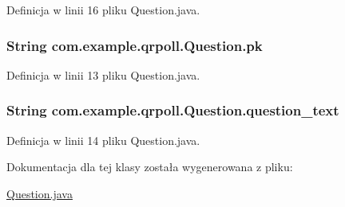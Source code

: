 Definicja w linii 16 pliku Question.\+java.

\hypertarget{classcom_1_1example_1_1qrpoll_1_1_question_ab94e31e243d24239faf4ae4c68c28f0b}{
\subsubsection[{pk}]{\setlength{\rightskip}{0pt plus 5cm}String com.\+example.\+qrpoll.\+Question.\+pk\hspace{0.3cm}{\ttfamily [private]}}}\label{classcom_1_1example_1_1qrpoll_1_1_question_ab94e31e243d24239faf4ae4c68c28f0b}


Definicja w linii 13 pliku Question.\+java.

\hypertarget{classcom_1_1example_1_1qrpoll_1_1_question_ab90d61211a23303be8fe8139aed31754}{
\subsubsection[{question\+\_\+text}]{\setlength{\rightskip}{0pt plus 5cm}String com.\+example.\+qrpoll.\+Question.\+question\+\_\+text\hspace{0.3cm}{\ttfamily [private]}}}\label{classcom_1_1example_1_1qrpoll_1_1_question_ab90d61211a23303be8fe8139aed31754}


Definicja w linii 14 pliku Question.\+java.



Dokumentacja dla tej klasy została wygenerowana z pliku\+:\begin{DoxyCompactItemize}
\item 
\hyperlink{_question_8java}{Question.\+java}\end{DoxyCompactItemize}

